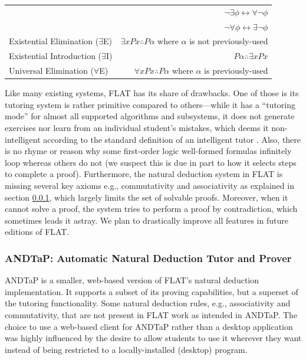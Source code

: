 \documentclass[ms]{uncgdissertationexp2}
\theoremstyle{plain}
\theoremstyle{definition}
\theoremstyle{remark}
\begin{document}
\begin{table}[!ht]
\begin{tabular}{lr}
							&$\lnot\exists\phi \leftrightarrow \forall\lnot\phi$\\
							&$\lnot\forall\phi \leftrightarrow \exists\lnot\phi$\\
		Existential Elimination ($\exists$E)&$\exists{x}Px \therefore P\alpha$ where $\alpha$ is not previously-used\\
		Existential Introduction ($\exists$I)&$P\alpha \therefore \exists{x}Px$\\
		Universal Elimination ($\forall$E)&$\forall{x}Px \therefore P\alpha$ where $\alpha$ is previously-used\\
	\bottomrule
  \end{tabular}
\end{table}

Like many existing systems, FLAT has its share of drawbacks. One of those is its tutoring system is rather primitive compared to others---while it has a ``tutoring mode'' for almost all supported algorithms and subsystems, it does not generate exercises nor learn from an individual student's mistakes, which deems it non-intelligent according to the standard definition of an intelligent tutor \cite{woolf}. Also, there is no rhyme or reason why some first-order logic well-formed formulas infinitely loop whereas others do not (we suspect this is due in part to how it selects steps to complete a proof). Furthermore, the natural deduction system in FLAT is missing several key axioms e.g., commutativity and associativity as explained in section \ref{section:andtap}, which largely limits the set of solvable proofs. Moreover, when it cannot solve a proof, the system tries to perform a proof by contradiction, which sometimes leads it astray. We plan to drastically improve all features in future editions of FLAT.

\subsubsection{ANDTaP: Automatic Natural Deduction Tutor and Prover}\label{section:andtap}
ANDTaP is a smaller, web-based version of FLAT's natural deduction implementation. It supports a subset of its proving capabilities, but a superset of the tutoring functionality. Some natural deduction rules, e.g., associativity and commutativity, that are not present in FLAT work as intended in ANDTaP. The choice to use a web-based client for ANDTaP rather than a desktop application was highly influenced by the desire to allow students to use it wherever they want instead of being restricted to a locally-installed (desktop) program.
\end{document}

